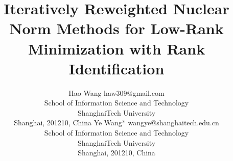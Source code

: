 \documentclass[twoside,11pt]{article}
\numberwithin{equation}{section}
\begin{document}
\title{Iteratively Reweighted Nuclear Norm Methods for Low-Rank Minimization with Rank Identification}

\author{\name Hao Wang \email haw309@gmail.com \\
       \addr School of Information Science and Technology\\
       ShanghaiTech University\\
       Shanghai, 201210, China
       \AND
       \name Ye Wang* \email wangye@shanghaitech.edu.cn\\
       \addr School of Information Science and Technology\\
       ShanghaiTech University\\
       Shanghai, 201210, China
       }


\maketitle
\end{document}
